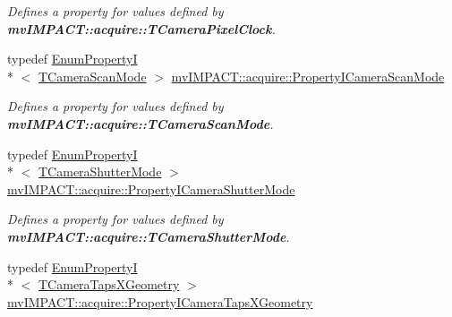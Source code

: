 \begin{DoxyCompactItemize}
\begin{DoxyCompactList}\small\item\em Defines a property for values defined by {\bfseries mv\+I\+M\+P\+A\+C\+T\+::acquire\+::\+T\+Camera\+Pixel\+Clock}. \end{DoxyCompactList}\item 
\hypertarget{group___device_specific_interface_ga762c072be6a70ec34c79682ae145f677}{typedef \hyperlink{classmv_i_m_p_a_c_t_1_1acquire_1_1_enum_property_i}{Enum\+Property\+I}\\*
$<$ \hyperlink{group___device_specific_interface_gaf4fc430c8da5f7825766e0a542f26801}{T\+Camera\+Scan\+Mode} $>$ \hyperlink{group___device_specific_interface_ga762c072be6a70ec34c79682ae145f677}{mv\+I\+M\+P\+A\+C\+T\+::acquire\+::\+Property\+I\+Camera\+Scan\+Mode}}\label{group___device_specific_interface_ga762c072be6a70ec34c79682ae145f677}

\begin{DoxyCompactList}\small\item\em Defines a property for values defined by {\bfseries mv\+I\+M\+P\+A\+C\+T\+::acquire\+::\+T\+Camera\+Scan\+Mode}. \end{DoxyCompactList}\item 
\hypertarget{group___device_specific_interface_gae67620addf31f8c9a17c46d8a7e5464a}{typedef \hyperlink{classmv_i_m_p_a_c_t_1_1acquire_1_1_enum_property_i}{Enum\+Property\+I}\\*
$<$ \hyperlink{group___device_specific_interface_ga20dd9ab797852e2e4b9a81bf8de2f2d6}{T\+Camera\+Shutter\+Mode} $>$ \hyperlink{group___device_specific_interface_gae67620addf31f8c9a17c46d8a7e5464a}{mv\+I\+M\+P\+A\+C\+T\+::acquire\+::\+Property\+I\+Camera\+Shutter\+Mode}}\label{group___device_specific_interface_gae67620addf31f8c9a17c46d8a7e5464a}

\begin{DoxyCompactList}\small\item\em Defines a property for values defined by {\bfseries mv\+I\+M\+P\+A\+C\+T\+::acquire\+::\+T\+Camera\+Shutter\+Mode}. \end{DoxyCompactList}\item 
\hypertarget{group___device_specific_interface_gadb3acd27da51bc318c073aa7d052607b}{typedef \hyperlink{classmv_i_m_p_a_c_t_1_1acquire_1_1_enum_property_i}{Enum\+Property\+I}\\*
$<$ \hyperlink{group___device_specific_interface_ga25ba65893f1ee0e7de99cb51bb858d99}{T\+Camera\+Taps\+X\+Geometry} $>$ \hyperlink{group___device_specific_interface_gadb3acd27da51bc318c073aa7d052607b}{mv\+I\+M\+P\+A\+C\+T\+::acquire\+::\+Property\+I\+Camera\+Taps\+X\+Geometry}}\label{group___device_specific_interface_gadb3acd27da51bc318c073aa7d052607b}


\end{DoxyCompactItemize}
